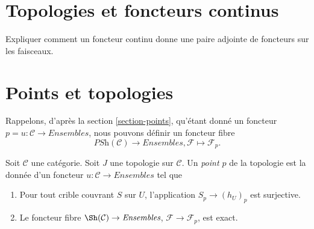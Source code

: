 \section{Topologies et foncteurs continus}
\label{section-topologies-continuous-functors}

\noindent
Expliquer comment un foncteur continu donne une paire adjointe
de foncteurs sur les faisceaux.





\section{Points et topologies}
\label{section-points-topologies}

\noindent
Rappelons, d'après la section \ref{section-points}, qu'étant donné un foncteur
$p = u : \mathcal{C} \to \textit{Ensembles}$, nous pouvons définir
un foncteur fibre
$$
\textit{PSh}(\mathcal{C}) \longrightarrow \textit{Ensembles},
\mathcal{F} \longmapsto \mathcal{F}_p.
$$

\begin{definition}
\label{definition-point-topology}
Soit $\mathcal{C}$ une catégorie.
Soit $J$ une topologie sur $\mathcal{C}$.
Un {\it point $p$} de la topologie est la donnée d'un foncteur
$u : \mathcal{C} \to \textit{Ensembles}$ tel que
\begin{enumerate}
\item Pour tout crible couvrant $S$ sur $U$, l'application
$S_p \to (h_U)_p$ est surjective.
\item Le foncteur fibre $\Sh(\mathcal{C}) \to \textit{Ensembles}$,
$\mathcal{F} \to \mathcal{F}_p$, est exact.
\end{enumerate}
\end{definition}



















